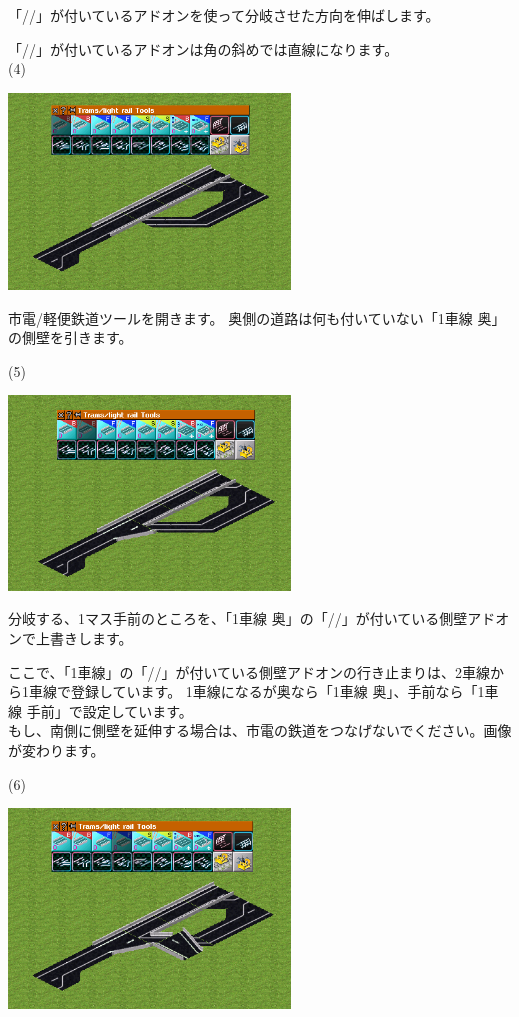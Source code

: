 \documentclass{jbook}
\begin{document}
\begin{multicols}{2}
「//」が付いているアドオンを使って分岐させた方向を伸ばします。

「//」が付いているアドオンは角の斜めでは直線になります。\\


(4)

\includegraphics[width = 75mm]{picture/20210214-road-2-4.png}

市電/軽便鉄道ツールを開きます。
奥側の道路は何も付いていない「1車線 奥」の側壁を引きます。\\

\newpage

(5)

\includegraphics[width = 75mm]{picture/20210214-road-2-5.png}

分岐する、1マス手前のところを、「1車線 奥」の「//」が付いている側壁アドオンで上書きします。

ここで、「1車線」の「//」が付いている側壁アドオンの行き止まりは、2車線から1車線で登録しています。
1車線になるが奥なら「1車線 奥」、手前なら「1車線 手前」で設定しています。\\

もし、南側に側壁を延伸する場合は、市電の鉄道をつなげないでください。画像が変わります。

(6)

\includegraphics[width = 75mm]{picture/20210214-road-2-6.png}


\end{multicols}
\end{document}
